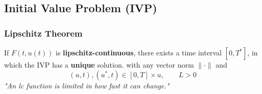 \subsection{Initial Value Problem (IVP)}
    \subsubsection{Lipschitz Theorem}
        If $F(t,u(t))$ is \textbf{lipschitz-continuous}, there exists a time interval $[0,T^*]$, in which the IVP has a \textbf{unique} solution.
        with any vector norm $\lVert \cdot \rVert$ and
        $$
            (u,t), (u^*, t) \in [0,T] \times u, \qquad L >0 
        $$
        \vskip4pt
        \textit{"An lc function is limited in how fast it can change."}
